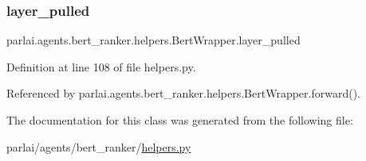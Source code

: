 \mbox{\label{classparlai_1_1agents_1_1bert__ranker_1_1helpers_1_1BertWrapper_a9223033165d667d6449fdc463d268fe4}} 
\subsubsection{\texorpdfstring{layer\+\_\+pulled}{layer\_pulled}}
{\footnotesize\ttfamily parlai.\+agents.\+bert\+\_\+ranker.\+helpers.\+Bert\+Wrapper.\+layer\+\_\+pulled}



Definition at line 108 of file helpers.\+py.



Referenced by parlai.\+agents.\+bert\+\_\+ranker.\+helpers.\+Bert\+Wrapper.\+forward().



The documentation for this class was generated from the following file\+:\begin{DoxyCompactItemize}
\item 
parlai/agents/bert\+\_\+ranker/\hyperlink{helpers_8py}{helpers.\+py}\end{DoxyCompactItemize}

